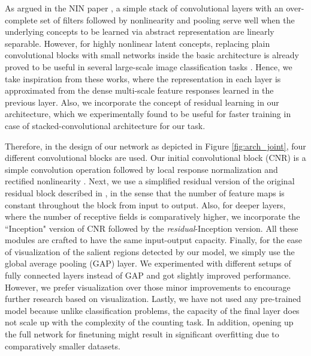 \documentclass[10pt,twocolumn,letterpaper]{article}
\begin{document}
As argued in the NIN paper \cite{nin}, a simple stack of convolutional layers with an over-complete set of filters followed by nonlinearity and pooling serve well when the underlying concepts to be learned via abstract representation are linearly separable. However, for highly nonlinear latent concepts, replacing plain convolutional blocks with small networks inside the basic architecture is already proved to be useful in several large-scale image classification tasks \cite{inception-01, inception-02}. Hence, we take inspiration from these works, where the representation in each layer is approximated from the dense multi-scale feature responses learned in the previous layer.  Also, we incorporate the concept of residual learning \cite{resnet} in our architecture, which we experimentally found to be useful for faster training in case of stacked-convolutional architecture for our task.

Therefore, in the design of our network as depicted in Figure \ref{fig:arch_joint}, four different convolutional blocks are used. Our initial convolutional block (CNR) is a simple convolution operation followed by local response normalization and rectified nonlinearity \cite{alexnet}. Next, we use a simplified residual version of the original residual block described in \cite{resnet}, in the sense that the number of feature maps is constant throughout the block from input to output. Also, for deeper layers, where the number of receptive fields is comparatively higher, we incorporate the ``Inception" version of CNR followed by the \textit{residual}-Inception version. All these modules are crafted to have the same input-output capacity.  Finally, for the ease of visualization of the salient regions detected by our model, we simply use the global average pooling (GAP) \cite{nin} layer. We experimented with different setups of fully connected layers instead of GAP and got slightly improved performance. However, we prefer visualization over those minor improvements to encourage further research based on visualization. Lastly, we have not used any pre-trained model because unlike classification problems, the capacity of the final layer does not scale up with the complexity of the counting task. In addition, opening up the full network for finetuning might result in significant overfitting due to comparatively smaller datasets.

\end{document}
